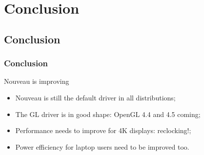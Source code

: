 \documentclass[11pt,english,compress]{beamer}
\begin{document}
\section{Conclusion}

\subsection*{Conclusion}
\begin{frame}
	\frametitle{Conclusion}

	\begin{block}{Nouveau is improving}
		\begin{itemize}
			\item Nouveau is still the default driver in all distributions;
			\item The GL driver is in good shape: OpenGL 4.4 and 4.5 coming;
			\item Performance needs to improve for 4K displays: reclocking!;
			\item Power efficiency for laptop users need to be improved too.
		\end{itemize}
	\end{block}
\end{frame}
\end{document}
